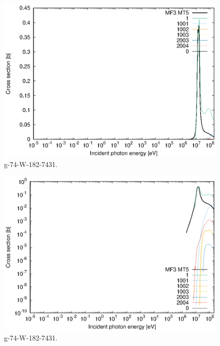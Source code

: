 \begin{figure}
 \includegraphics[width=\linewidth]{eps/g_74-W-182_7431.eps}
  \caption{g-74-W-182-7431.}
\end{figure}
\begin{figure}
 \includegraphics[width=\linewidth]{eps-log/g_74-W-182_7431.eps}
 \caption{g-74-W-182-7431.}
\end{figure}
\newpage \clearpage

